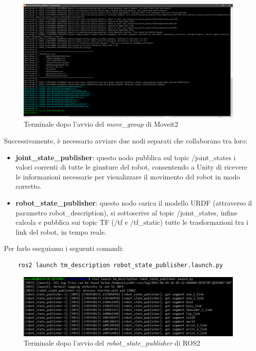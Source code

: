 \documentclass[11pt]{report}
\begin{document}
\begin{figure} [H]
    \centering
    \includegraphics[width=1\textwidth]{images/move_group.PNG}
    \caption{Terminale dopo l'avvio del \textit{move\_group} di Moveit2}
    \label{fig:move_group}
\end{figure}

Successivamente, è necessario avviare due nodi separati che collaborano tra loro:
\begin{itemize}
    \item \textbf{joint\_state\_publisher}: questo nodo pubblica sul topic /joint\_states i valori correnti di tutte le giunture del robot, consentendo a Unity di ricevere le informazioni necessarie per visualizzare il movimento del robot in modo corretto.
    \item \textbf{robot\_state\_publisher}: questo nodo carica il modello URDF (attraverso il parametro robot\_description), si sottoscrive al topic /joint\_states, infine calcola e pubblica sui topic TF (/tf e /tf\_static) tutte le trasformazioni tra i link del robot, in tempo reale.
\end{itemize}

Per farlo eseguiamo i seguenti comandi:

\begin{verbatim}
    ros2 launch tm_description robot_state_publisher.launch.py
\end{verbatim}

\begin{figure} [H]
    \centering
    \includegraphics[width=1\textwidth]{images/terminale_2.PNG}
    \caption{Terminale dopo l'avvio del \textit{robot\_state\_publisher} di ROS2}
    \label{fig:terminale_2}
\end{figure}
\end{document}
